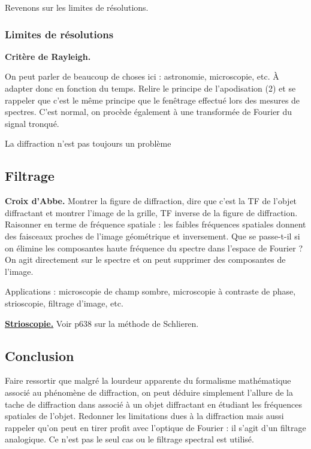 \begin{transition}
Revenons sur les limites de résolutions.
\end{transition}

\subsubsection{Limites de résolutions}

\begin{slide}
\textbf{Critère de Rayleigh.}
\end{slide}

\begin{remarque}
On peut parler de beaucoup de choses ici : astronomie, microscopie, etc.
À adapter donc en fonction du temps.
Relire le principe de l'apodisation \cite{Sayrin2019} (2) et se rappeler que c'est le même principe que le fenêtrage effectué lors des mesures de spectres.
C'est normal, on procède également à une transformée de Fourier du signal tronqué.
\end{remarque}

\begin{transition}
La diffraction n'est pas toujours un problème
\end{transition}

\subsection{Filtrage}

\begin{experience}
\textbf{Croix d'Abbe.}
Montrer la figure de diffraction, dire que c'est la TF de l'objet diffractant et montrer l'image de la grille, TF inverse de la figure de diffraction.
Raisonner en terme de fréquence spatiale : les faibles fréquences spatiales donnent des faisceaux proches de l'image géométrique et inversement.
Que se passe-t-il si on élimine les composantes haute fréquence du spectre dans l'espace de Fourier ?
On agit directement sur le spectre et on peut supprimer des composantes de l'image.
\end{experience}

Applications : microscopie de champ sombre, microscopie à contraste de phase, strioscopie, filtrage d'image, etc.

\begin{slide}
\textbf{\href{https://youtu.be/4tgOyU34D44?t=11}{Strioscopie.}}
Voir \cite{Hecht2002} p638 sur la méthode de Schlieren.
\end{slide}

\subsection*{Conclusion}

Faire ressortir que malgré la lourdeur apparente du formalisme mathématique associé au phénomène de diffraction, on peut déduire simplement l'allure de la tache de diffraction dans associé à un objet diffractant en étudiant les fréquences spatiales de l'objet.
Redonner les limitations dues à la diffraction mais aussi rappeler qu'on peut en tirer profit avec l'optique de Fourier : il s'agit d'un filtrage analogique.
Ce n'est pas le seul cas ou le filtrage spectral est utilisé.

\newpage